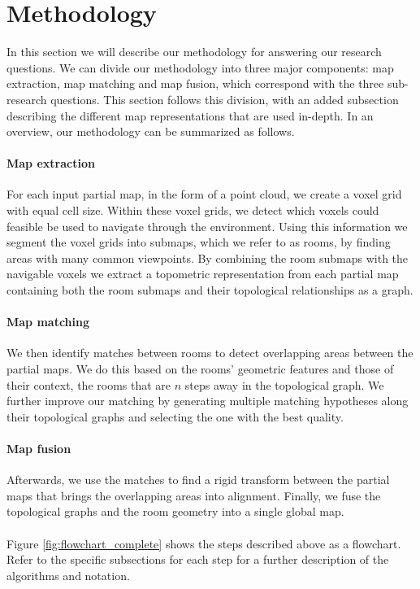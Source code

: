 \section{Methodology}
In this section we will describe our methodology for answering our research questions. We can divide our methodology into three major components: map extraction, map matching and map fusion, which correspond with the three sub-research questions. This section follows this division, with an added subsection describing the different map representations that are used in-depth. In an overview, our methodology can be summarized as follows. 

\paragraph{Map extraction}
For each input partial map, in the form of a point cloud, we create a voxel grid with equal cell size. Within these voxel grids, we detect which voxels could feasible be used to navigate through the environment. Using this information we segment the voxel grids into submaps, which we refer to as rooms, by finding areas with many common viewpoints. By combining the room submaps with the navigable voxels we extract a topometric representation from each partial map containing both the room submaps and their topological relationships as a graph. 

\paragraph{Map matching}
We then identify matches between rooms to detect overlapping areas between the partial maps. We do this based on the rooms' geometric features and those of their context, the rooms that are \(n\) steps away in the topological graph. We further improve our matching by generating multiple matching hypotheses along their topological graphs and selecting the one with the best quality. 

\paragraph{Map fusion}
Afterwards, we use the matches to find a rigid transform between the partial maps that brings the overlapping areas into alignment. Finally, we fuse the topological graphs and the room geometry into a single global map.

\paragraph{}
Figure \ref{fig:flowchart_complete} shows the steps described above as a flowchart. Refer to the specific subsections for each step for a further description of the algorithms and notation.

